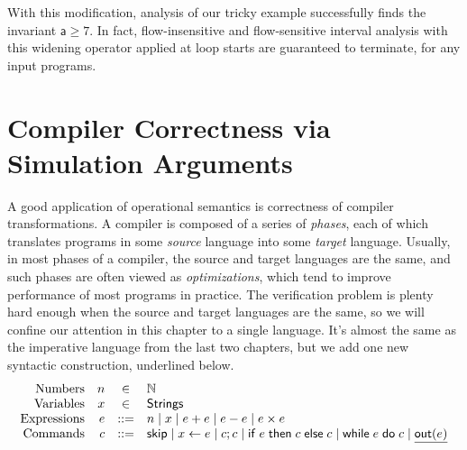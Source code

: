 \documentclass{amsbook}
\theoremstyle{definition}
\theoremstyle{remark}
\numberwithin{section}{chapter}
\numberwithin{equation}{chapter}
\begin{document}
With this modification, analysis of our tricky example successfully finds the invariant $\mathsf{a} \geq 7$.
In fact, flow-insensitive and flow-sensitive interval analysis with this widening operator applied at loop starts are guaranteed to terminate, for any input programs.



\chapter{\label{compiler_correctness}Compiler Correctness via Simulation Arguments}

\newcommand{\outp}[1]{\mathsf{out}(#1)}

A good application of operational semantics is correctness of compiler transformations.
A compiler is composed of a series of \emph{phases}, each of which translates programs in some \emph{source} language into some \emph{target} language.
Usually, in most phases of a compiler, the source and target languages are the same, and such phases are often viewed as \emph{optimizations}, which tend to improve performance of most programs in practice.
The verification problem is plenty hard enough when the source and target languages are the same, so we will confine our attention in this chapter to a single language.
It's almost the same as the imperative language from the last two chapters, but we add one new syntactic construction, underlined below.
$$\begin{array}{rrcl}
  \textrm{Numbers} & n &\in& \mathbb N \\
  \textrm{Variables} & x &\in& \mathsf{Strings} \\
  \textrm{Expressions} & e &::=& n \mid x \mid e + e \mid e - e \mid e \times e \\
  \textrm{Commands} & c &::=& \skipe \mid \assign{x}{e} \mid c; c \mid \ifte{e}{c}{c} \mid \while{e}{c} \mid \underline{\outp{e}}
\end{array}$$
\end{document}
